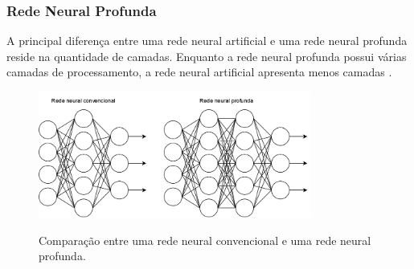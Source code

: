 \subsubsection*{Rede Neural Profunda}

A principal diferença entre uma rede neural artificial e uma rede neural profunda reside na quantidade de camadas. Enquanto a rede neural profunda possui várias camadas de processamento, a rede neural artificial apresenta menos camadas .

\begin{figure}[ht]
\centering
\caption{Comparação entre uma rede neural convencional e uma rede neural profunda.}
\includegraphics[width=0.8\textwidth]{figures/redes_neurais.png}
\label{fig:redes_neurais}
\end{figure}